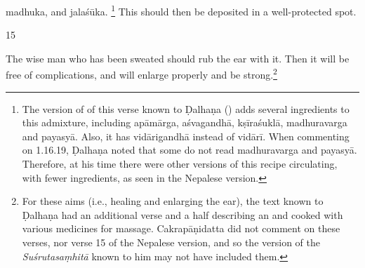 \begin{translation}
        \gls{madhuka}, %
        and \gls{jalaśūka}.%
\footnote{The version of of this verse known to Ḍalhaṇa ()
            adds several ingredients to this admixture, including \gls{apāmārga},
            \gls{aśvagandhā}, \gls{kṣīraśuklā}, \gls{madhuravarga} and \gls{payasyā}.
            Also, it has \gls{vidārigandhā} instead of \gls{vidārī}. When commenting
            on 1.16.19, Ḍalhaṇa \citep[79]{vulgate} noted that some do not read
            \gls{madhuravarga} and \gls{payasyā}. Therefore, at his time there were
            other versions of this recipe circulating, with fewer ingredients, as seen
            in the Nepalese version.}
            This should then be deposited in a well-protected spot.
    

\smallskip
    
\item[15]%
    \begin{em}
The wise man who has been sweated should rub the  
ear with
it. Then it will be free of complications, and will enlarge properly and be
strong.\footnote{For these aims (i.e., healing and enlarging the ear), the text
    known to Ḍalhaṇa \citep[79]{vulgate} had an additional verse and a half describing
    an  and 
     cooked
    with various medicines for massage. Cakrapāṇidatta \citep[131]{acar-1939} did not
    comment on these verses, nor verse 15 of the Nepalese version, and so the version
    of the \emph{Suśrutasaṃhitā} known to him may not have included them.}
    \end{em}
    

\end{translation}
